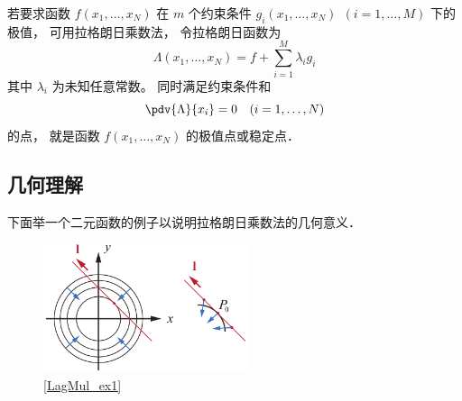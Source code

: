

若要求函数 $f(x_1,\dots, x_N)$ 在 $m$ 个约束条件 $g_i(x_1, \dots, x_N)\ \ (i = 1,\dots, M)$ 下的极值， 可用拉格朗日乘数法， 令拉格朗日函数为
\begin{equation}
\Lambda(x_1,\dots, x_N) = f + \sum_{i=1}^M \lambda_i g_i
\end{equation} 
其中 $\lambda_i$ 为未知任意常数。 同时满足约束条件和
\begin{equation}
\pdv{\Lambda}{x_i} = 0 \quad (i = 1,\dots, N)
\end{equation}
的点， 就是函数 $f(x_1, \dots, x_N)$ 的极值点或稳定点．

\subsection{几何理解}

下面举一个二元函数的例子以说明拉格朗日乘数法的几何意义．

\begin{figure}[ht]
\centering
\includegraphics[width=6cm]{./figures/LagMul.pdf}
\caption{\autoref{LagMul_ex1}} \label{LagMul_fig1}
\end{figure}


